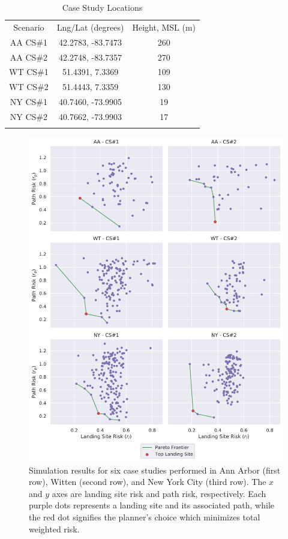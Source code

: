 \begin{table}[ht]
\centering
\caption{Case Study Locations}
\label{table:ch5_case_studies}
\begin{tabular}{c@{\qquad}c@{\qquad}c}
\hline\noalign{\smallskip}
Scenario   & Lng/Lat (degrees)        & Height, MSL (m)  \\
\noalign{\smallskip}\hline\noalign{\smallskip}
AA CS\#1    & 42.2783, -83.7473  & 260          \\
AA CS\#2    & 42.2748, -83.7357   & 270          \\
WT CS\#1    & 51.4391, 7.3369   & 109          \\
WT CS\#2    & 51.4443, 7.3359   & 130          \\
NY CS\#1    & 40.7460, -73.9905   & 19         \\
NY CS\#2    & 40.7662, -73.9903   & 17         \\
\noalign{\smallskip}\hline\noalign{\smallskip}
\end{tabular}
\end{table}

\begin{figure}[t]
    \centering
    \includegraphics[clip, trim=0.2cm 0cm 0cm 0cm, width=.80\linewidth]{chapter_5_mapping/imgs/all_pareto.pdf}
    \caption[Pareto frontier of case studies]{Simulation results for six case studies performed in Ann Arbor (first row), Witten (second row), and New York City (third row). The $x$ and $y$ axes are landing site risk and path risk, respectively. Each purple dots represents a landing site and its associated path, while the red dot signifies the planner's choice which minimizes total weighted risk.}
    \label{fig:ch5_all_pareto_plots}
\end{figure}

